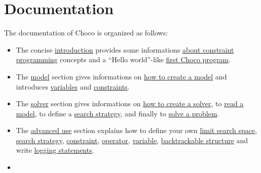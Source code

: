 \part{Documentation}\label{ch:doc}\hypertarget{ch:doc}{}

The documentation of Choco is organized as follows:
\begin{itemize}
\item 
The concise \hyperlink{doc:introduction}{introduction} provides some informations \hyperlink{introduction:aboutconstraintprogramming}{about constraint programming} concepts and a ``Hello world''-like \hyperlink{introduction:myfirstchocoprogram}{first Choco program}.
\item 
The \hyperlink{doc:model}{model} section gives informations on \hyperlink{doc:model}{how to create a model} and introduces \hyperlink{model:variables}{variables} and \hyperlink{model:constraints}{constraints}.
\item 
The \hyperlink{doc:solver}{solver} section gives informations on \hyperlink{doc:solver}{how to create a solver}, to \hyperlink{doc:solver}{read a model}, to define a \hyperlink{solver:searchstrategy}{search strategy}, and finally to \hyperlink{solver:solveaproblem}{solve a problem}.
\item 
The \hyperlink{doc:advanced}{advanced use} section explains how to define your own \hyperlink{advanced:defineyourownlimitsearchspace}{limit search space}, \hyperlink{advanced:defineyourownsearchstrategy}{search strategy}, \hyperlink{advanced:defineyourownconstraint}{constraint}, \hyperlink{advanced:defineyourownoperator}{operator}, \hyperlink{advanced:defineyourownvariable}{variable}, \hyperlink{advanced:backtrackablestructures}{backtrackable structure} and write \hyperlink{advanced:howtowriteloggingstatements}{logging statements}.
\item 
\end{itemize}


